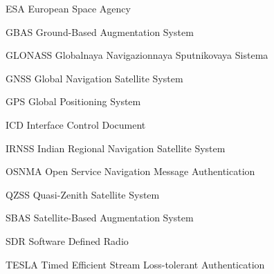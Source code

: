 \begin{abbreviations}

\item[ESA] European Space Agency
\item[GBAS] Ground-Based Augmentation System
\item[GLONASS] Globalnaya Navigazionnaya Sputnikovaya Sistema
\item[GNSS] Global Navigation Satellite System
\item[GPS] Global Positioning System
\item[ICD] Interface Control Document
\item[IRNSS] Indian Regional Navigation Satellite System
\item[OSNMA] Open Service Navigation Message Authentication
\item[QZSS] Quasi-Zenith Satellite System
\item[SBAS] Satellite-Based Augmentation System
\item[SDR] Software Defined Radio
\item[TESLA] Timed Efficient Stream Loss-tolerant Authentication

\end{abbreviations}
